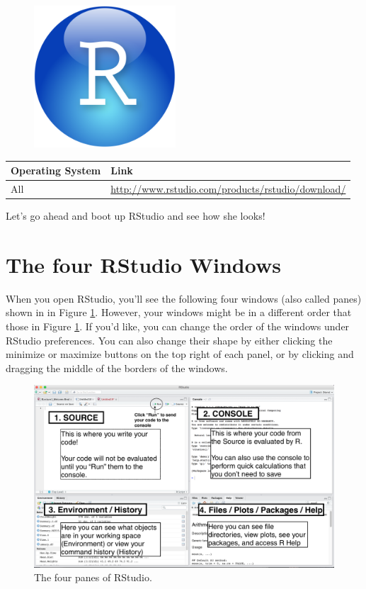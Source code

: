 \documentclass[]{book}
\theoremstyle{definition}
\theoremstyle{definition}
\theoremstyle{remark}
\begin{document}
\begin{figure}
\includegraphics[width=200px]{images/RStudio} \end{figure}

\begin{longtable}[]{@{}ll@{}}
\toprule
Operating System & Link\tabularnewline
\midrule
\endhead
All &
\url{http://www.rstudio.com/products/rstudio/download/}\tabularnewline
\bottomrule
\end{longtable}

Let's go ahead and boot up RStudio and see how she looks!

\section{The four RStudio Windows}\label{the-four-rstudio-windows}

When you open RStudio, you'll see the following four windows (also
called panes) shown in in Figure \ref{fig:rstudiowindows}. However, your
windows might be in a different order that those in Figure
\ref{fig:rstudiowindows}. If you'd like, you can change the order of the
windows under RStudio preferences. You can also change their shape by
either clicking the minimize or maximize buttons on the top right of
each panel, or by clicking and dragging the middle of the borders of the
windows.

\begin{figure}
\includegraphics[width=600px]{images/RStudio_Screenshot_Labels} \caption{The four panes of RStudio.}\label{fig:rstudiowindows}
\end{figure}
\end{document}
